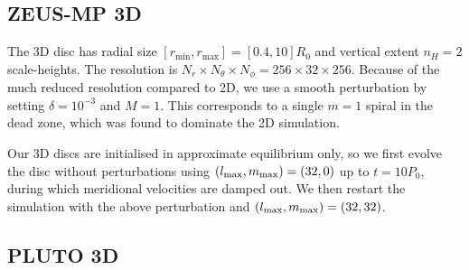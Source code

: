\subsection{ZEUS-MP 3D}
The 3D disc has radial size 
$[r_\mathrm{min},r_\mathrm{max}]=[0.4,10]R_0$ and vertical extent
$n_H=2$ scale-heights. The resolution is $N_r\times N_\theta\times
N_\phi=256\times32\times256$. Because of the much reduced resolution
compared to 2D, we use a smooth perturbation by setting
$\delta = 10^{-3}$ and $M=1$. This corresponds to a single $m=1$
spiral in the dead zone, which was found to dominate the 2D
simulation. 

Our 3D discs are initialised in approximate equilibrium only, so we
first evolve the disc without perturbations using  
$(l_\mathrm{max},m_\mathrm{max})=(32,0)$ up to $t=10P_0$, during which 
meridional velocities are damped out. We then restart the simulation
with the above perturbation and $(l_\mathrm{max},m_\mathrm{max})=(32,32)$. 






\subsection{PLUTO 3D}






